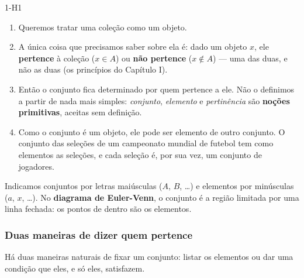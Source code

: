 \begin{construcao}{1-H1}
\begin{enumerate}[label=(\arabic*)]
  \item Queremos tratar uma coleção como um objeto.
  \item A única coisa que precisamos saber sobre ela é: dado um objeto $x$, ele \textbf{pertence} à coleção ($x\in A$) ou \textbf{não pertence} ($x\notin A$) — uma das duas, e não as duas (os princípios do Capítulo I).
  \item Então o conjunto fica determinado por quem pertence a ele. Não o definimos a partir de nada mais simples: \emph{conjunto}, \emph{elemento} e \emph{pertinência} são \textbf{noções primitivas}, aceitas sem definição.
  \item Como o conjunto é um objeto, ele pode ser elemento de outro conjunto. O conjunto das seleções de um campeonato mundial de futebol tem como elementos as seleções, e cada seleção é, por sua vez, um conjunto de jogadores.
\end{enumerate}
Indicamos conjuntos por letras maiúsculas ($A$, $B$, \ldots) e elementos por minúsculas ($a$, $x$, \ldots). No \textbf{diagrama de Euler-Venn}, o conjunto é a região limitada por uma linha fechada: os pontos de dentro são os elementos.
\begin{center}
\end{center}
\end{construcao}

\subsubsection{Duas maneiras de dizer quem pertence}
Há duas maneiras naturais de fixar um conjunto: listar os elementos ou dar uma condição que eles, e só eles, satisfazem.

